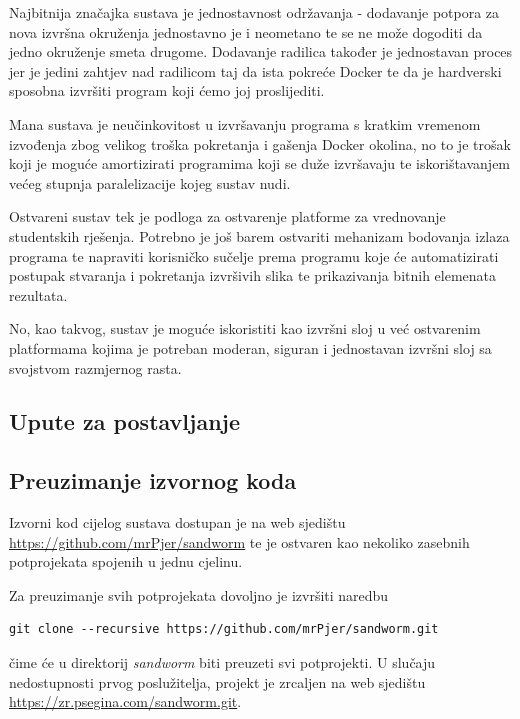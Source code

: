 \documentclass[times, utf8, zavrsni]{fer}
\begin{document}
{{{Najbitnija značajka sustava je jednostavnost održavanja - dodavanje potpora za nova izvršna okruženja jednostavno je i neometano te se ne može dogoditi da jedno okruženje smeta drugome. Dodavanje radilica također je jednostavan proces jer je jedini zahtjev nad radilicom taj da ista pokreće Docker te da je hardverski sposobna izvršiti program koji ćemo joj proslijediti.

Mana sustava je neučinkovitost u izvršavanju programa s kratkim vremenom izvođenja zbog velikog troška pokretanja i gašenja Docker okolina, no to je trošak koji je moguće amortizirati programima koji se duže izvršavaju te iskorištavanjem većeg stupnja paralelizacije kojeg sustav nudi.

Ostvareni sustav tek je podloga za ostvarenje platforme za vrednovanje studentskih rješenja. Potrebno je još barem ostvariti mehanizam bodovanja izlaza programa te napraviti korisničko sučelje prema programu koje će automatizirati postupak stvaranja i pokretanja izvršivih slika te prikazivanja bitnih elemenata rezultata.

No, kao takvog, sustav je moguće iskoristiti kao izvršni sloj u već ostvarenim platformama kojima je potreban moderan, siguran i jednostavan izvršni sloj sa svojstvom razmjernog rasta.

\begin{appendices}

\chapter{Upute za postavljanje}

\section{Preuzimanje izvornog koda}

Izvorni kod cijelog sustava dostupan je na web sjedištu {\url{https://github.com/mrPjer/sandworm}} te je ostvaren kao nekoliko zasebnih potprojekata spojenih u jednu cjelinu.

Za preuzimanje svih potprojekata dovoljno je izvršiti naredbu

\begin{lstlisting}
git clone --recursive https://github.com/mrPjer/sandworm.git
\end{lstlisting}

čime će u direktorij {\textit{sandworm}} biti preuzeti svi potprojekti. U slučaju nedostupnosti prvog poslužitelja, projekt je zrcaljen na web sjedištu {\url{https://zr.psegina.com/sandworm.git}}.


\end{appendices}}}}
\end{document}
